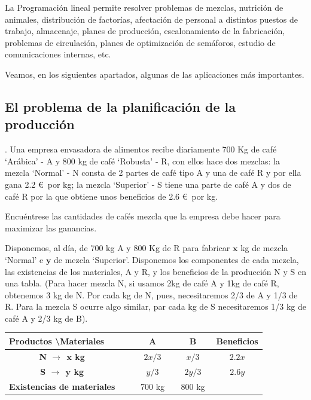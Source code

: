 La Programación lineal permite resolver problemas de mezclas, nutrición de animales, distribución de factorías, afectación de personal a distintos puestos de trabajo, almacenaje, planes de producción, escalonamiento de la fabricación, problemas de circulación, planes de optimización de semáforos, estudio de comunicaciones internas, etc.

Veamos, en los siguientes apartados,  algunas de las aplicaciones más importantes.


	\subsection{El problema de la planificación de la producción}
	\vspace{10mm}
	

\begin{example}
.	Una empresa envasadora de alimentos recibe diariamente 700 Kg de café  `Arábica' - A y 800 kg de café `Robusta' - R, con ellos hace dos mezclas: la mezcla `Normal' - N consta de 2 partes de café tipo A y una de café R y por ella gana 2.2 \euro $\,$ por kg; la mezcla `Superior' - S tiene una parte de café A y dos de café R por la que obtiene unos beneficios de 2.6 \euro $\,$ por kg.

\vspace{2mm}
Encuéntrese las cantidades de cafés mezcla que la empresa debe hacer para maximizar las ganancias.
\end{example}

Disponemos, al día, de 700 kg A y 800 Kg de R para fabricar $\boldsymbol{x}$ kg de mezcla `Normal' e $\boldsymbol{y}$ de mezcla `Superior'. Disponemos los componentes de cada mezcla, las existencias de los materiales, A y R, y los beneficios de la producción N y S en una tabla. \textcolor{gris}{(Para hacer mezcla N, si usamos 2kg de café A y 1kg de café R, obtenemos 3 kg de N. Por cada kg de N, pues, necesitaremos 2/3 de A y 1/3 de R. Para la mezcla S ocurre algo similar, par cada kg de S necesitaremos 1/3 kg de café A y 2/3 kg de B).}

\begin{table}[H]
\centering
\begin{tabular}{ll|c|c|c}
\textbf{Productos \textbackslash Materiales} & $\ \ $ & \textbf{A} & \textbf{B} & \textbf{Beneficios} \\ \hline
\multicolumn{1}{c}{\textbf{N $\to \ \ \boldsymbol{x}$ kg}} &  & $\quad 2x/3 \quad$ & $\quad x/3 \quad$ & $\quad 2.2x \quad $ \\ \hline
\multicolumn{1}{c}{\textbf{S $\to \ \ \boldsymbol{y}$ kg}} &  & $y/3$ & $2y/3$ & $2.6y$ \\ \hline
\textbf{Existencias de materiales} &  & 700 kg & 800 kg &  \\ \cline{3-4}
\end{tabular}
\end{table}

